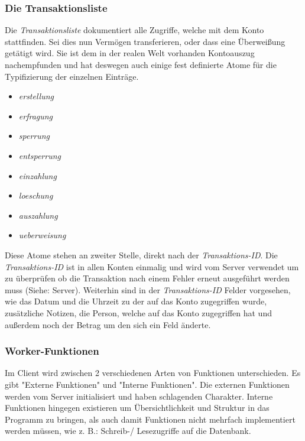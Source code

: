 \subsubsection{Die Transaktionsliste}
Die \textit{Transaktionsliste} dokumentiert alle Zugriffe, welche mit dem Konto stattfinden. Sei dies nun Vermögen transferieren, oder dass eine Überweißung getätigt wird. Sie ist dem in der realen Welt vorhanden Kontoauszug nachempfunden und hat deswegen auch einige fest definierte Atome für die Typifizierung der einzelnen Einträge.
\begin{itemize}
\item \textit{erstellung}
\item \textit{erfragung}
\item \textit{sperrung}
\item \textit{entsperrung}
\item \textit{einzahlung}
\item \textit{loeschung}
\item \textit{auszahlung}
\item \textit{ueberweisung}
\end{itemize}
Diese Atome stehen an zweiter Stelle, direkt nach der \textit{Transaktions-ID}. Die \textit{Transaktions-ID} ist in allen Konten einmalig und wird vom Server verwendet um zu überprüfen ob die Transaktion nach einem Fehler erneut ausgeführt werden muss (Siehe: Server). Weiterhin sind in der \textit{Transaktions-ID} Felder vorgesehen, wie das Datum und die Uhrzeit zu der auf das Konto zugegriffen wurde, zusätzliche Notizen, die Person, welche auf das Konto zugegriffen hat und außerdem noch der Betrag um den sich ein Feld änderte. 
\subsubsection{Worker-Funktionen}
Im Client wird zwischen 2 verschiedenen Arten von Funktionen unterschieden. Es gibt "Externe Funktionen" und "Interne Funktionen". Die externen Funktionen werden vom Server initialisiert und haben schlagenden Charakter. Interne Funktionen hingegen existieren um Übersichtlichkeit und Struktur in das Programm zu bringen, als auch damit Funktionen nicht mehrfach implementiert werden müssen, wie z. B.: Schreib-/ Lesezugriffe auf die Datenbank.

